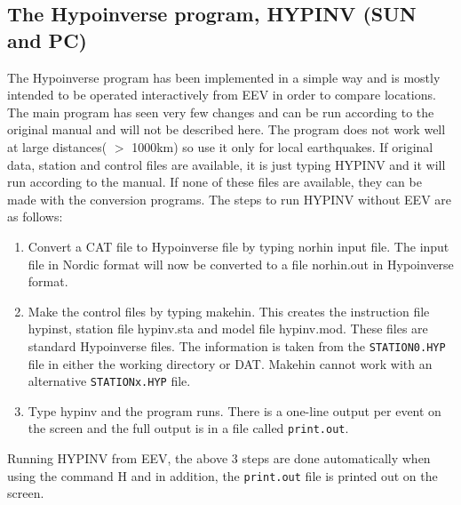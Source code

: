 
\subsection{The Hypoinverse program, HYPINV (SUN and PC)} 

The Hypoinverse program has been implemented in a simple way and is mostly intended to be operated interactively from EEV in order to compare locations. The main program has seen very few changes and can be run according to the original manual \citep{klein1984} and will not be described here. The program does not work well at large distances( $>$ 1000km) so use it only for local earthquakes. If original data, station and control files are available, it is just typing HYPINV and it will run according to the manual. If none of these files are available, they can be made with the conversion programs. The steps to run HYPINV without EEV are as follows: 

\begin{enumerate}
\item
Convert a CAT file to Hypoinverse file by typing norhin input file. The input file in Nordic format will now be converted to a file norhin.out in Hypoinverse format. 
\item
Make the control files by typing makehin. This creates the instruction file hypinst, station file hypinv.sta and model file hypinv.mod. These files are standard Hypoinverse files. The information is taken from the \texttt{STATION0.HYP} file in either the working directory or DAT. Makehin cannot work with 
an alternative \texttt{STATIONx.HYP} file. 
\item
Type hypinv and the program runs. There is a one-line output per event on the screen and the full output is in a file called \texttt{print.out}. 
\end{enumerate}

Running HYPINV from EEV, the above 3 steps are done automatically when using the command H and in addition, the \texttt{print.out} file is printed out on the screen. 

